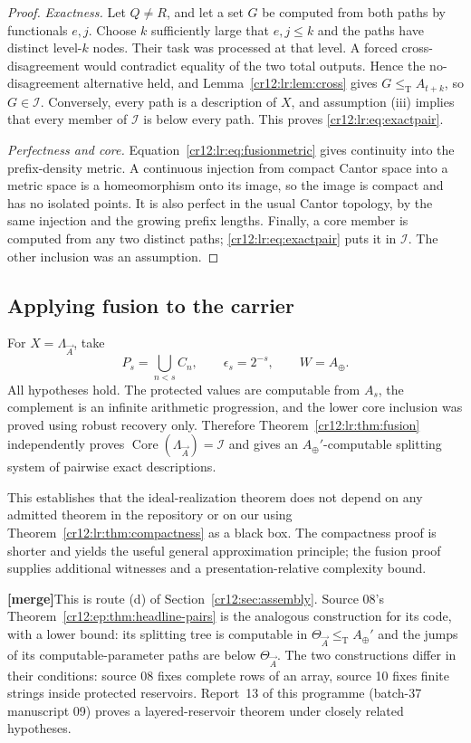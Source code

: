 \documentclass[11pt,letterpaper]{article}
\theoremstyle{plain}
\theoremstyle{definition}
\theoremstyle{remark}
\numberwithin{equation}{section}
\newcommand{\leT}{\leq_{\mathrm T}}
\newcommand{\Core}{\operatorname{Core}}
\newcommand{\I}{\mathcal I}
\newcommand{\mergenote}[1]{\par\smallskip\noindent
 {\small\textsf{\textbf{[merge]}}\enspace #1}\par\smallskip}
\newcommand{\Aplus}{A_{\oplus}}          %
\newcommand{\Lam}{\Lambda_{\vec A}}      %
\begin{document}
\begin{proof}
\emph{Exactness.} Let $Q\ne R$, and let a set $G$ be computed from both paths by
functionals $e,j$. Choose $k$ sufficiently large that $e,j\leq k$ and the paths have
distinct level-$k$ nodes. Their task was processed at that level. A forced
cross-disagreement would contradict equality of the two total outputs. Hence the
no-disagreement alternative held, and Lemma~\ref{cr12:lr:lem:cross} gives
$G\leT A_{t+k}$, so $G\in\I$. Conversely, every path is a description of $X$, and
assumption (iii) implies that every member of $\I$ is below every path. This proves
\eqref{cr12:lr:eq:exactpair}.

\emph{Perfectness and core.} Equation~\eqref{cr12:lr:eq:fusionmetric} gives continuity
into the prefix-density metric. A continuous injection from compact Cantor space into
a metric space is a homeomorphism onto its image, so the image is compact and has no
isolated points. It is also perfect in the usual Cantor topology, by the same
injection and the growing prefix lengths. Finally, a core member is computed from any
two distinct paths; \eqref{cr12:lr:eq:exactpair} puts it in $\I$. The other inclusion
was an assumption.
\end{proof}

\subsection{Applying fusion to the carrier}
For $X=\Lam$, take
\[
 P_s=\bigcup_{n<s}C_n,\qquad \epsilon_s=2^{-s},\qquad W=\Aplus.
\]
All hypotheses hold. The protected values are computable from $A_s$, the complement is
an infinite arithmetic progression, and the lower core inclusion was proved using
robust recovery only. Therefore Theorem~\ref{cr12:lr:thm:fusion} independently proves
$\Core(\Lam)=\I$ and gives an $\Aplus'$-computable splitting system of pairwise exact
descriptions.

This establishes that the ideal-realization theorem does not depend on any admitted
theorem in the repository or on our using Theorem~\ref{cr12:lr:thm:compactness} as a
black box. The compactness proof is shorter and yields the useful general
approximation principle; the fusion proof supplies additional witnesses and a
presentation-relative complexity bound.

\mergenote{This is route (d) of Section~\ref{cr12:sec:assembly}. Source 08's
Theorem~\ref{cr12:ep:thm:headline-pairs} is the analogous construction for its code,
with a lower bound: its splitting tree is computable in
$\Theta_{\vec A}\leT\Aplus'$ and the jumps of its computable-parameter paths are below
$\Theta_{\vec A}$. The two constructions differ in their conditions: source 08 fixes
complete rows of an array, source 10 fixes finite strings inside protected reservoirs.
Report~13 of this programme (batch-37 manuscript 09) proves a layered-reservoir theorem
under closely related hypotheses.}
\end{document}
